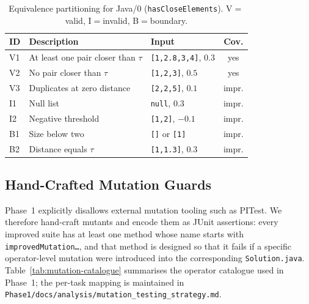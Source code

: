 \documentclass[journal]{IEEEtran}
\begin{document}
\begin{table}[!t]
\renewcommand{\arraystretch}{1.15}
\caption{Equivalence partitioning for Java/0 (\texttt{hasCloseElements}).
V$=$valid, I$=$invalid, B$=$boundary.}
\label{tab:eq-example}
\centering
\footnotesize
\begin{tabular}{@{}lp{3.0cm}p{2.4cm}c@{}}
\toprule
\textbf{ID} & \textbf{Description} & \textbf{Input} & \textbf{Cov.} \\
\midrule
V1 & At least one pair closer than $\tau$ & \texttt{[1,2.8,3,4]}, $0.3$ & yes \\
V2 & No pair closer than $\tau$           & \texttt{[1,2,3]}, $0.5$     & yes \\
V3 & Duplicates at zero distance          & \texttt{[2,2,5]}, $0.1$     & impr. \\
I1 & Null list                            & \texttt{null}, $0.3$        & impr. \\
I2 & Negative threshold                   & \texttt{[1,2]}, $-0.1$      & impr. \\
B1 & Size below two                       & \texttt{[]} or \texttt{[1]} & impr. \\
B2 & Distance equals $\tau$               & \texttt{[1,1.3]}, $0.3$     & impr. \\
\bottomrule
\end{tabular}
\end{table}

\subsection{Hand-Crafted Mutation Guards}\label{sec:mutation}

Phase~1 explicitly disallows external mutation tooling such as PITest. We
therefore hand-craft mutants and encode them as JUnit assertions: every
improved suite has at least one method whose name starts with
\texttt{improvedMutation\ldots}, and that method is designed so that it
fails if a specific operator-level mutation were introduced into the
corresponding \texttt{Solution.java}. Table~\ref{tab:mutation-catalogue}
summarises the operator catalogue used in Phase~1; the per-task mapping is
maintained in \texttt{Phase1/docs/analysis/mutation\_testing\_strategy.md}.
\end{document}
